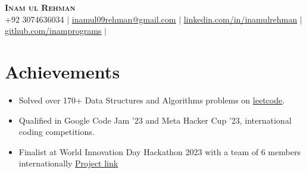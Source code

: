 \documentclass[letterpaper,11pt]{article}
\newcommand{\resumeItem}[1]{
  \item\small{
    {#1 \vspace{-2pt}}
  }
}
\newcommand{\resumeSubHeadingListStart}{\begin{itemize}[leftmargin=0.15in, label={}]}
\newcommand{\resumeSubHeadingListEnd}{\end{itemize}}
\newcommand{\resumeItemListStart}{\begin{itemize}}
\newcommand{\resumeItemListEnd}{\end{itemize}\vspace{-5pt}}
\begin{document}

\begin{center}
  \textbf{\Huge \scshape Inam ul Rehman } \\ \vspace{1pt}
  \small +92 3074636034 $|$
  \href{mailto:inamul09rehman@gmail.com}{\underline{inamul09rehman@gmail.com}} $|$
  \href{https://www.linkedin.com/in/inamulrehman/}{\underline{linkedin.com/in/inamulrehman}} $|$
  \href{https://github.com/inamprograms}{\underline{github.com/inamprograms}} $|$
\end{center}

\section{Achievements}
\resumeItemListStart
\resumeItem{Solved over 170+ Data Structures and Algorithms problems on {\href{https://leetcode.com/inamulrehman09/}{\underline{leetcode}}}.}
\resumeItem{Qualified in Google Code Jam '23 and Meta Hacker Cup '23, international coding competitions.}
\resumeItem{Finalist at World Innovation Day Hackathon 2023 with a team of 6 members internationally
    {\href{https://github.com/inamprograms/EquiDonate}{\underline{Project link}}}}
\resumeItemListEnd
\end{document}
